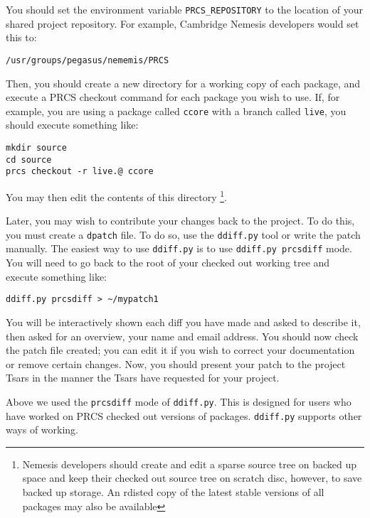 \documentclass{article}
\begin{document}
You should set the environment variable \texttt{PRCS\_REPOSITORY} to
the location of your shared project repository. For example, Cambridge
Nemesis developers would set this to:

\begin{verbatim}
/usr/groups/pegasus/nememis/PRCS
\end{verbatim}

Then, you should create a
new directory for a working copy of each package, and execute a PRCS
checkout command for each package you wish to use. If, for example,
you are using a package called \texttt{ccore} with a branch called \texttt{live}, you
should execute something like:

\begin{verbatim}
mkdir source
cd source
prcs checkout -r live.@ ccore
\end{verbatim}

You may then edit the contents of this directory \footnote{Nemesis
developers should create and edit a sparse source tree on backed up
space and keep their checked out source tree on scratch disc, however,
to save backed up storage. An rdisted copy of the latest stable
versions of all packages may also be available}.

Later, you may wish to contribute your changes back to the project. To
do this, you must create a \texttt{dpatch} file. To do so, use the
\texttt{ddiff.py} tool or write the patch manually. The easiest way to
use \texttt{ddiff.py} is to use \texttt{ddiff.py prcsdiff} mode. You
will need to go back to the root of your checked out working tree and
execute something like:

\begin{verbatim}
ddiff.py prcsdiff > ~/mypatch1
\end{verbatim}

You will be interactively shown each diff you have made and asked to
describe it, then asked for an overview, your name and email
address. You should now check the patch file created; you can edit it
if you wish to correct your documentation or remove certain changes. 
Now, you should present your patch to the project Tsars in the manner
the Tsars have requested for your project.

Above we used the \texttt{prcsdiff} mode of \texttt{ddiff.py}. This is
designed for users who have worked on PRCS checked out versions of
packages. \texttt{ddiff.py} supports other ways of working. 
\end{document}
